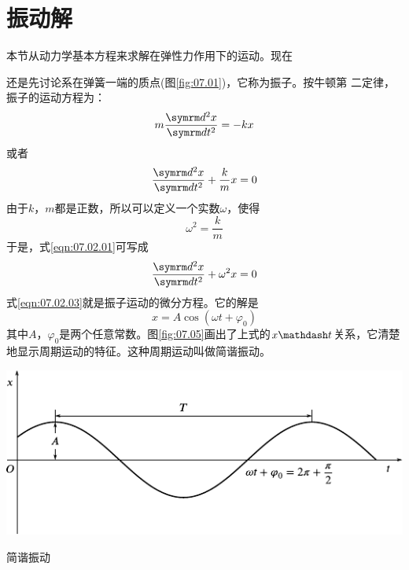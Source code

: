 \section{振动解}\label{sec:07.02}

本节从动力学基本方程来求解在弹性力作用下的运动。现在

\noindent
还是先讨论系在弹簧一端的质点(图\ref{fig:07.01})，它称为振子。按牛顿第
二定律，振子的运动方程为：
\begin{equation*}
  m \frac { \dif ^ { 2 } x } { \dif t ^ { 2 } } = - k x
\end{equation*}
或者\vspace{-1.56em}
\begin{equation}\label{eqn:07.02.01}
  \frac { \dif ^ { 2 } x } { \dif t ^ { 2 } } + \frac { k } { m } x = 0
\end{equation}
由于$ k $，$ m $都是正数，所以可以定义一个实数$ \omega $，使得
\begin{equation}\label{eqn:07.02.02}
  \omega ^ { 2 } = \frac { k } { m }
\end{equation}
于是，式\eqref{eqn:07.02.01}可写成
\begin{equation}\label{eqn:07.02.03}
  \frac { \dif ^ { 2 } x } { \dif t ^ { 2 } } + \omega ^ { 2 } x = 0
\end{equation}
式\eqref{eqn:07.02.03}就是振子运动的微分方程。它的解是
\begin{equation}\label{eqn:07.02.04}
  x = A \cos \left( \omega t + \varphi _ { 0 } \right)
\end{equation}
其中$ A $，$ \varphi _ { 0 } $是两个任意常数。图\ref{fig:07.05}\;画出了上式的$ x \mathdash t $关系，它清楚
地显示周期运动的特征。这种周期运动叫做简谐振动。

\begin{figurex}
  \vspace{1em}
  \centering
  \includegraphics{figure/fig07.05}
  \caption{简谐振动}
  \label{fig:07.05}
  \vspace{1em}
\end{figurex}

